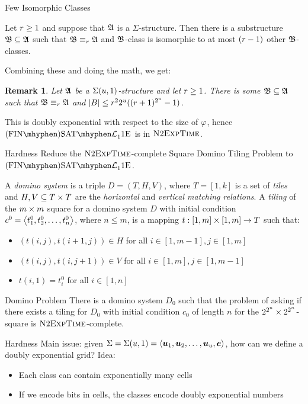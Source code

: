 \documentclass{beamer}
\newtheorem{remark}{Remark}
\begin{document}
\begin{frame}{Few Isomorphic Classes}
\begin{lemma}
Let $r \geq 1$ and suppose that $\mathfrak{A}$ is a $\Sigma$-structure.
Then there is a substructure $\mathfrak{B}\subseteq\mathfrak{A}$ such that
$\mathfrak{B}\equiv_{r}\mathfrak{A}$ and $\mathfrak{B}$-class is isomorphic to at most $(r-1)$
other $\mathfrak{B}$-classes.
\end{lemma}

Combining these and doing the math, we get:
\begin{remark}
Let $\mathfrak{A}$ be a $\Sigma(u,1)$-structure and let $r\geq1$.
There is some $\mathfrak{B}\subseteq\mathfrak{A}$ such that $\mathfrak{B}\equiv_{r}\mathfrak{A}$ and
$\left|B\right| \leq r^2 2^u ((r+1)^{2^u}-1)$.
\end{remark}
\pause

This is doubly exponential with respect to the size of $\varphi$, hence
$\FinASat{\Lvp\LL\nonv1\Eea1\noag}$ is in $\text{\normalfont{\scshape N}}2\text{\normalfont{\scshape ExpTime}}$.
\end{frame}

\begin{frame}{Hardness}
Reduce the $\text{\normalfont{\scshape N}}2\text{\normalfont{\scshape ExpTime}}$-complete Square Domino Tiling Problem to
$\FinASat{\Lvp\LL\nonv1\Eea1\noag}$.

A \emph{domino system} is a triple $D = (T,H,V)$, where
$T = [1,k]$ is a set of \emph{tiles} and $H,V\subseteq T\times T$ are the
\emph{horizontal} and \emph{vertical matching relations}.
A \emph{tiling} of the $m\times m$ square for a domino system $D$ with initial
condition $c^0 = \left\langle t_1^0,t_2^0,\dots,t_n^0 \right\rangle$, where $n\leq m$, is a mapping
$t : [1,m]\times [1,m]\to T$ such that:
\begin{itemize}
  \item $(t(i,j),t(i+1,j))\in H$ for all $i\in[1,m-1], j\in[1,m]$
  \item $(t(i,j),t(i,j+1))\in V$ for all $i\in[1,m], j\in[1,m-1]$
  \item $t(i,1) = t_i^0$ for all $i\in[1,n]$
\end{itemize}
\end{frame}

\begin{frame}{Domino Problem}
There is a domino system $D_0$ such that the problem of asking if there exists a
tiling for $D_0$ with initial condition $c_0$ of length $n$ for the
$2^{2^n}\times 2^{2^n}$-square is $\text{\normalfont{\scshape N}}2\text{\normalfont{\scshape ExpTime}}$-complete.
\end{frame}

\begin{frame}{Hardness}
Main issue: given $\Sigma = \Sigma(u,1) = \left\langle \bm{u}_{1},\bm{u}_{2},\dots,\bm{u}_{u},\bm{e} \right\rangle$,
how can we define a doubly exponential grid?
\pause
Idea:
\begin{itemize}
  \item Each class can contain exponentially many cells
  \item If we encode bits in cells, the classes encode doubly exponential
  numbers
\end{itemize}
\end{frame}
\end{document}
